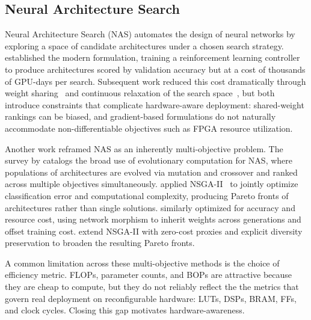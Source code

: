 \documentclass[11pt]{article}
\begin{document}
\subsection{Neural Architecture Search}
Neural Architecture Search (NAS) automates the design of neural networks by exploring a space of candidate architectures under a chosen search strategy.
\citet{zoph2016neural} established the modern formulation, training a reinforcement learning controller to produce architectures scored by validation accuracy but at a cost of thousands of GPU-days per search.
Subsequent work reduced this cost dramatically through weight sharing~\citep{pham2018efficient} and continuous relaxation of the search space~\citep{liu2018darts}, but both introduce constraints that complicate hardware-aware deployment: shared-weight rankings can be biased, and gradient-based formulations do not naturally accommodate non-differentiable objectives such as FPGA resource utilization.

Another work reframed NAS as an inherently multi-objective problem.
The survey by \citet{9508774} catalogs the broad use of evolutionary computation for NAS, where populations of architectures are evolved via mutation and crossover and ranked across multiple objectives simultaneously.
\citet{lu2019nsga} applied NSGA-II~\citep{NSGA} to jointly optimize classification error and computational complexity, producing Pareto fronts of architectures rather than single solutions.
\citet{elsken2018efficient} similarly optimized for accuracy and resource cost, using network morphism to inherit weights across generations and offset training cost.
\citet{sinha2024multi} extend NSGA-II with zero-cost proxies and
explicit diversity preservation to broaden the resulting Pareto
fronts.

A common limitation across these multi-objective methods is the choice of efficiency metric.
FLOPs, parameter counts, and BOPs are attractive because they are cheap to compute, but they do not reliably reflect the the metrics that govern real deployment on reconfigurable hardware: LUTs, DSPs, BRAM, FFs, and clock cycles.
Closing this gap motivates hardware-awareness.
\end{document}
